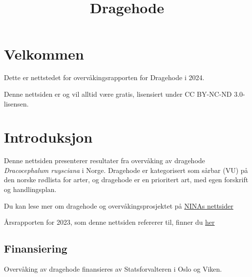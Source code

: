\documentclass[
  letterpaper,
  DIV=11,
  numbers=noendperiod]{scrreport}
\title{Dragehode}
\author{}
\date{}
\renewcommand*\contentsname{Table of contents}
\newcommand\contentsname{Table of contents}
\begin{document}
\maketitle
\ifdefined\Shaded\renewenvironment{Shaded}{\begin{tcolorbox}[enhanced, sharp corners, interior hidden, frame hidden, breakable, boxrule=0pt, borderline west={3pt}{0pt}{shadecolor}]}{\end{tcolorbox}}\fi

\renewcommand*\contentsname{Table of contents}
{
\hypersetup{linkcolor=}
\setcounter{tocdepth}{2}
\tableofcontents
}

\hypertarget{velkommen}{%
\chapter*{Velkommen}\label{velkommen}}


Dette er nettstedet for overvåkingsrapporten for Dragehode i 2024.

Denne nettsiden er og vil alltid være gratis, lisensiert under CC
BY-NC-ND 3.0-lisensen.


\hypertarget{sec-intro}{%
\chapter{Introduksjon}\label{sec-intro}}

Denne nettsiden presenterer resultater fra overvåking av dragehode
\emph{Dracocephalum ruysciana} i Norge. Dragehode er kategorisert som
sårbar (VU) på den norske rødlista for arter, og dragehode er en
prioritert art, med egen forskrift og handlingsplan.

Du kan lese mer om dragehode og overvåkingsprosjektet på
\href{https://www.nina.no/Naturmangfold/Trua-natur/Dragehode}{NINAs
nettsider}

Årsrapporten for 2023, som denne nettsiden refererer til, finner du
\href{https://brage.nina.no/nina-xmlui/handle/11250/3052108}{her}

\hypertarget{finansiering}{%
\section{Finansiering}\label{finansiering}}

Overvåking av dragehode finansieres av Statsforvalteren i Oslo og Viken.
\end{document}
